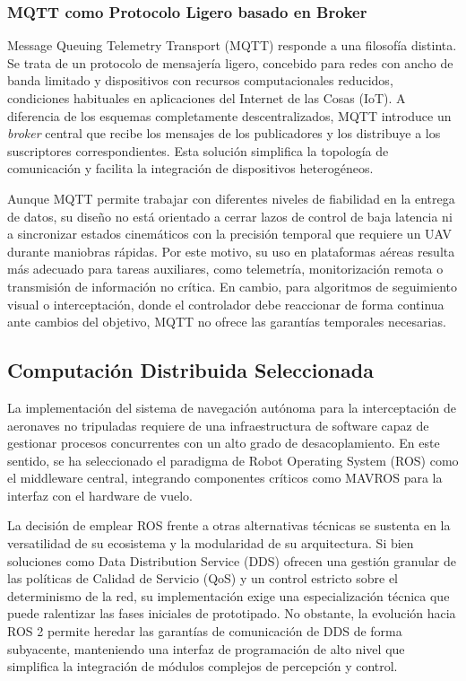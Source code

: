 \subsubsection{MQTT como Protocolo Ligero basado en Broker}

Message Queuing Telemetry Transport (MQTT) responde a una filosofía distinta. Se trata de un protocolo de mensajería ligero, concebido para redes con ancho de banda limitado y dispositivos con recursos computacionales reducidos, condiciones habituales en aplicaciones del Internet de las Cosas (IoT). A diferencia de los esquemas completamente descentralizados, MQTT introduce un \textit{broker} central que recibe los mensajes de los publicadores y los distribuye a los suscriptores correspondientes. Esta solución simplifica la topología de comunicación y facilita la integración de dispositivos heterogéneos.

\vspace{0.3cm}

Aunque MQTT permite trabajar con diferentes niveles de fiabilidad en la entrega de datos, su diseño no está orientado a cerrar lazos de control de baja latencia ni a sincronizar estados cinemáticos con la precisión temporal que requiere un UAV durante maniobras rápidas. Por este motivo, su uso en plataformas aéreas resulta más adecuado para tareas auxiliares, como telemetría, monitorización remota o transmisión de información no crítica. En cambio, para algoritmos de seguimiento visual o interceptación, donde el controlador debe reaccionar de forma continua ante cambios del objetivo, MQTT no ofrece las garantías temporales necesarias.

\vspace{0.4cm}
\subsection{Computación Distribuida Seleccionada}

La implementación del sistema de navegación autónoma para la interceptación de aeronaves no tripuladas requiere de una infraestructura de software capaz de gestionar procesos concurrentes con un alto grado de desacoplamiento. En este sentido, se ha seleccionado el paradigma de Robot Operating System (ROS) como el middleware central, integrando componentes críticos como MAVROS para la interfaz con el hardware de vuelo.

\vspace{0.4cm}

La decisión de emplear ROS frente a otras alternativas técnicas se sustenta en la versatilidad de su ecosistema y la modularidad de su arquitectura. Si bien soluciones como Data Distribution Service (DDS) ofrecen una gestión granular de las políticas de Calidad de Servicio (QoS) y un control estricto sobre el determinismo de la red, su implementación exige una especialización técnica que puede ralentizar las fases iniciales de prototipado. No obstante, la evolución hacia ROS 2 permite heredar las garantías de comunicación de DDS de forma subyacente, manteniendo una interfaz de programación de alto nivel que simplifica la integración de módulos complejos de percepción y control.


